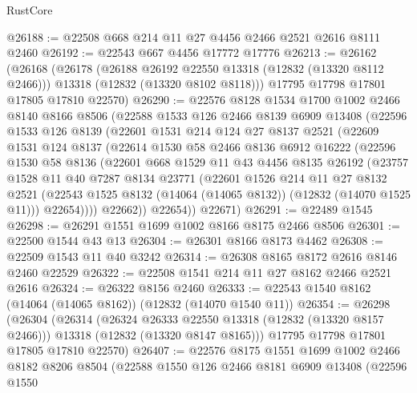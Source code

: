 \begin{lexlean}{RustCore}
\begin{coremodule}
@26188 := @22508 @668 @214 @11 @27 @4456 @2466 @2521 @2616 @8111 @2460
@26192 := @22543 @667 @4456 @17772 @17776
@26213 := @26162
    (@26168
      (@26178
        (@26188 @26192 @22550 @13318 (@12832 (@13320 @8112 @2466)))
        @13318
        (@12832 (@13320 @8102 @8118)))
      @17795
      @17798
      @17801
      @17805
      @17810
      @22570)
@26290 := @22576
    @8128
    @1534
    @1700
    @1002
    @2466
    @8140
    @8166
    @8506
    (@22588
      @1533
      @126
      @2466
      @8139
      @6909
      @13408
      (@22596
        @1533
        @126
        @8139
        (@22601
          @1531
          @214
          @124
          @27
          @8137
          @2521
          (@22609
            @1531
            @124
            @8137
            (@22614
              @1530
              @58
              @2466
              @8136
              @6912
              @16222
              (@22596
                @1530
                @58
                @8136
                (@22601
                  @668
                  @1529
                  @11
                  @43
                  @4456
                  @8135
                  @26192
                  (@23757
                    @1528
                    @11
                    @40
                    @7287
                    @8134
                    @23771
                    (@22601
                      @1526
                      @214
                      @11
                      @27
                      @8132
                      @2521
                      (@22543 @1525 @8132 (@14064 (@14065 @8132)) (@12832 (@14070 @1525 @11)))
                      @22654))))
              @22662))
          @22654))
      @22671)
@26291 := @22489 @1545
@26298 := @26291 @1551 @1699 @1002 @8166 @8175 @2466 @8506
@26301 := @22500 @1544 @43 @13
@26304 := @26301 @8166 @8173 @4462
@26308 := @22509 @1543 @11 @40 @3242
@26314 := @26308 @8165 @8172 @2616 @8146 @2460 @22529
@26322 := @22508 @1541 @214 @11 @27 @8162 @2466 @2521 @2616
@26324 := @26322 @8156 @2460
@26333 := @22543 @1540 @8162 (@14064 (@14065 @8162)) (@12832 (@14070 @1540 @11))
@26354 := @26298
    (@26304
      (@26314
        (@26324 @26333 @22550 @13318 (@12832 (@13320 @8157 @2466)))
        @13318
        (@12832 (@13320 @8147 @8165)))
      @17795
      @17798
      @17801
      @17805
      @17810
      @22570)
@26407 := @22576
    @8175
    @1551
    @1699
    @1002
    @2466
    @8182
    @8206
    @8504
    (@22588
      @1550
      @126
      @2466
      @8181
      @6909
      @13408
      (@22596
        @1550

\end{coremodule}
\end{lexlean}

